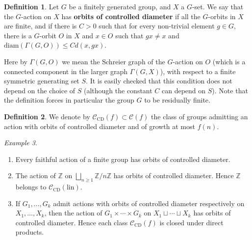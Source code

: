 \documentclass[11pt]{amsart}
\newcommand{\R}{\ensuremath{\mathbb{R}}}%
\newcommand{\Z}{\ensuremath{\mathbb{Z}}}%
\newcommand{\vol}{\ensuremath{\operatorname{vol}}}%
\newcommand{\Class}{\ensuremath{\mathcal{C}}}
\theoremstyle{definition}
\newtheorem{defin}{Definition}[section]
\theoremstyle{plain}
\theoremstyle{remark}
\newtheorem{example}[defin]{Example}
\begin{document}

\begin{defin} \label{defin-m-control}
	Let $G$ be a finitely generated group, and $X$ a $G$-set. We say that the $G$-action on $X$ has \textbf{orbits of controlled diameter} if all the $G$-orbits in $X$ are finite, and if there is $C > 0$ such that for every non-trivial element $g \in G$, there is a $G$-orbit $O$ in $X$ and $x \in O$ such that $gx \neq x$ and $\mathrm{diam}(\Gamma(G,O)) \leq C d(x,gx)$. 
\end{defin}

Here by $\Gamma(G,O)$ we mean the Schreier graph of the $G$-action on $O$ (which is a connected component in the larger graph $\Gamma(G,X)$), with respect to a finite symmetric generating set $S$. It is easily checked that this condition does not depend on the choice of $S$ (although the constant $C$ can depend on $S$). Note that the definition forces in particular the group $G$ to be residually finite. 


\begin{defin}
	We denote by $\Class_{\mathrm{CD}}(f) \subset \Class(f) $ the class of groups admitting an action with orbits of controlled diameter and of growth at most $f(n)$.
\end{defin}

\begin{example} \label{e-LD} \noindent
	\begin{enumerate}
		\item Every faithful action of a finite group has orbits of controlled diameter.
		\item The action of $\Z$ on $\bigsqcup_{n \geq 1} \Z / n \Z$  has orbits of controlled diameter. Hence $\Z$ belongs to $\Class_{\mathrm{CD}}(\mathrm{lin})$.
		\item If $G_1, \ldots, G_k$ admit actions with orbits of controlled diameter respectively on $X_1, \ldots, X_k$, then the action of $G_1 \times \cdots \times G_k$ on $X_1 \sqcup \cdots \sqcup X_k$ has orbits of controlled diameter. Hence each class $\Class_{\mathrm{CD}}(f)$ is closed under direct products. 
	\end{enumerate}
\end{example}
\end{document}
